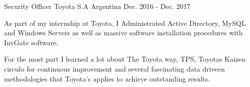 \begin{cventries}


\cventry
{Security Officer} %
{Toyota S.A} %
{Argentina} %
{Dec. 2016 - Dec. 2017} %
{
\begin{cvitems} %
\item {As part of my internship at Toyota, I Administrated Active Directory, MySQL and Windows Servers as well as massive software installation procedures with InvGate software.}
\item {For the most part I learned a lot about The Toyota way, TPS, Toyotas Kaizen circulo for continuous improvement and several fascinating data driveen methodologies that Toyota's applies to achieve outstanding results.}
\end{cvitems}
}
\end{cventries}
